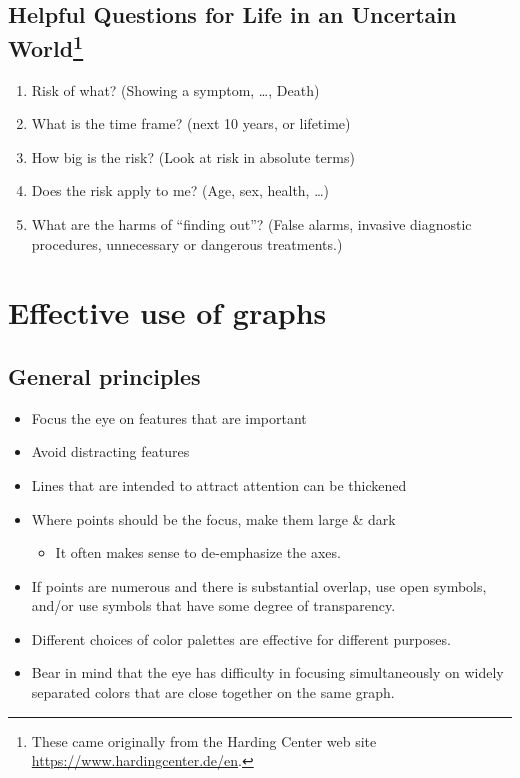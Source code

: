 \documentclass[
  10pt,
  b5paper]{book}
\providecommand{\tightlist}{%
  \setlength{\itemsep}{0pt}\setlength{\parskip}{0pt}}
\begin{document}
\hypertarget{helpful-questions-for-life-in-an-uncertain-world}{%
\section[Helpful Questions for Life in an Uncertain World]{\texorpdfstring{Helpful Questions for Life in an Uncertain World\footnote{These came originally from the Harding Center web site \url{https://www.hardingcenter.de/en}.}}{Helpful Questions for Life in an Uncertain World}}\label{helpful-questions-for-life-in-an-uncertain-world}}

\begin{enumerate}
\def\labelenumi{\arabic{enumi}.}
\tightlist
\item
  Risk of what? (Showing a symptom, \ldots, Death)
\item
  What is the time frame? (next 10 years, or lifetime)
\item
  How big is the risk? (Look at risk in absolute terms)
\item
  Does the risk apply to me? (Age, sex, health, \ldots)
\item
  What are the harms of ``finding out''? (False alarms, invasive
  diagnostic procedures, unnecessary or dangerous treatments.)
\end{enumerate}

\hypertarget{effective-use-of-graphs}{%
\chapter{Effective use of graphs}\label{effective-use-of-graphs}}

\hypertarget{general-principles}{%
\section{General principles}\label{general-principles}}

\begin{itemize}
\tightlist
\item
  Focus the eye on features that are important
\item
  Avoid distracting features
\item
  Lines that are intended to attract attention can be
  thickened
\item
  Where points should be the focus, make them large \& dark

  \begin{itemize}
  \tightlist
  \item
    It often makes sense to de-emphasize the axes.
  \end{itemize}
\item
  If points are numerous and there is substantial overlap,
  use open symbols, and/or use symbols that have some
  degree of transparency.
\item
  Different choices of color palettes are effective for different purposes.
\item
  Bear in mind that the eye has difficulty in focusing
  simultaneously on widely separated colors that are close
  together on the same graph.
\end{itemize}
\end{document}

